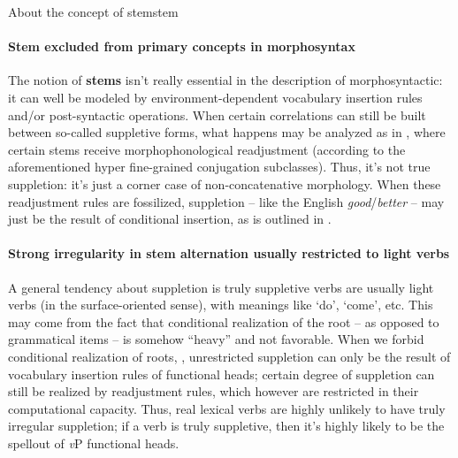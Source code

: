 \documentclass[a4paper, oneside]{report}
\newcommand*{\concept}[1]{\textbf{#1}}
\newcommand{\form}[1]{\emph{#1}}
\newcommand{\translate}[1]{`#1'}
\newcommand{\vP}{\textit{v}P}
\begin{document}
\begin{theorybox}{About the concept of stem}{stem}
    \paragraph*{Stem excluded from primary concepts in morphosyntax} 
    The notion of \concept{stems} isn't really essential in the description of morphosyntactic:
    it can well be modeled by environment-dependent vocabulary insertion rules 
    and/or post-syntactic operations.
    When certain correlations can still be built between so-called suppletive forms,
    what happens may be analyzed as in \citet{embick2005status},
    where certain stems receive morphophonological readjustment
    (according to the aforementioned hyper fine-grained conjugation subclasses).
    Thus, it's not true suppletion:
    it's just a corner case of non-concatenative morphology.
    When these readjustment rules are fossilized,
    suppletion -- like the English \form{good}/\form{better} -- 
    may just be the result of conditional insertion,
    as is outlined in \citet{siddiqi2009syntax}.

    \paragraph*{Strong irregularity in stem alternation usually restricted to light verbs} 
    A general tendency about suppletion
    is truly suppletive verbs are usually light verbs 
    (in the surface-oriented sense),
    with meanings like \translate{do}, \translate{come}, etc.
    This may come from the fact that conditional realization of the root -- 
    as opposed to grammatical items --
    is somehow ``heavy'' and not favorable.
    When we forbid conditional realization of roots,
    \citep{embick2005status},
    unrestricted suppletion can only be the result of 
    vocabulary insertion rules of functional heads;
    certain degree of suppletion can still be realized by readjustment rules,
    which however are restricted in their computational capacity.
    Thus, real lexical verbs are highly unlikely to have truly irregular suppletion;
    if a verb is truly suppletive,
    then it's highly likely to be 
    the spellout of \vP{} functional heads.
\end{theorybox}
\end{document}
